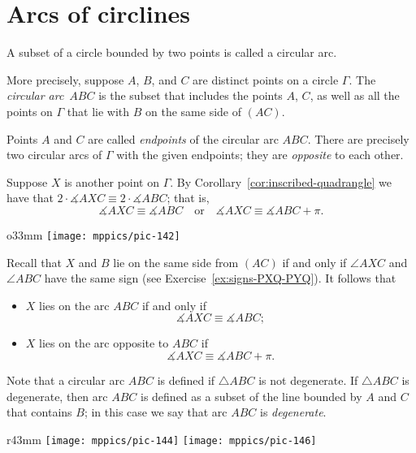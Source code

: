 \section{Arcs of circlines}

A subset of a circle bounded by two points is called a circular arc.

More precisely,
suppose $A$, $B$, and $C$ are distinct points on a circle $\Gamma$.
The \emph{circular arc}~$ABC$ is the subset that includes the points $A$, $C$,
as well as all the points on $\Gamma$ that lie with $B$ on the same side of $(AC)$.

Points $A$ and $C$ are called 
\emph{endpoints} of the circular arc $ABC$. 
There are precisely two circular arcs of $\Gamma$ with the given endpoints; they are \emph{opposite} to each other.

Suppose $X$ is another point on $\Gamma$.
By Corollary~\ref{cor:inscribed-quadrangle} we have
that $2\cdot\measuredangle AXC\equiv 2\cdot\measuredangle ABC$;
that is,
\[\measuredangle AXC\equiv\measuredangle ABC
\quad\text{or}\quad
\measuredangle AXC\equiv\measuredangle ABC+\pi.\]

\begin{wrapfigure}{o}{33mm}
\vskip-2mm
\centering
\texttt{[image: mppics/pic-142]}
\end{wrapfigure}

Recall that $X$ and $B$ lie on the same side from $(AC)$ if and only if $\angle AXC$ and $\angle ABC$ have the same sign (see Exercise~\ref{ex:signs-PXQ-PYQ}).
It follows that 
\begin{itemize}
\item $X$ lies on the arc $ABC$ if and only if 
\[\measuredangle AXC\equiv\measuredangle ABC;\]
\item $X$ lies on the arc opposite to $ABC$ if 
\[\measuredangle AXC\equiv\measuredangle ABC+\pi.\]
\end{itemize}

Note that a circular arc $ABC$ is defined if $\triangle ABC$ is not degenerate.
If $\triangle ABC$ is degenerate, then arc $ABC$ is defined as a subset of the line bounded by $A$ and $C$ that contains $B$;
in this case we say that arc $ABC$ is \emph{degenerate}.


\begin{wrapfigure}{r}{43mm}
\vskip-2mm
\centering
\texttt{[image: mppics/pic-144]}
\vskip4mm
\texttt{[image: mppics/pic-146]}
\end{wrapfigure}

